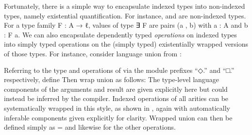 \documentclass[acmsmall,screen,timestamp,anonymous,review]{acmart}
\begin{document}
Fortunately, there is a simple way to encapsulate indexed types into non-indexed types, namely existential quantification.
For instance, { } and { } are non-indexed types.
For a type family {\AB F \AK : \AB A \AK →  \AB ℓ}, values of type {\AF ∃ \AB F} are pairs {(\AB a , \AB b)} with {\AB a \AK : \AB A} and {\AB b \AK : \AB F \AB a}.
We can also encapsulate dependently typed \emph{operations} on indexed types into simply typed operations on the (simply typed) existentially wrapped versions of those types.
For instance, consider language union from :
\begin{code}
\>[2]%
\>[7]\AgdaSymbol{:}\AgdaSpace{}%
%
\>[15]%
\>[18]\AgdaSpace{}%
\AgdaSpace{}%
%
\>[28]\AgdaSpace{}%
\AgdaSpace{}%
\AgdaSymbol{(}%
\>[39]%
\>[44]\AgdaSymbol{)}\<%
\end{code}
Referring to the type and operations of  via the module prefixes ``{◇.}\hspace{0.05em}'' and ``{□.}\hspace{0.05em}'' respectively, define 
Then wrap union as follows:
The type-level language components of the arguments and result are given explicitly here but could instead be inferred by the compiler.
\rnc{}
Indexed operations of all arities can be systematically wrapped in this style, as shown in
, again with automatically inferable components given explicitly for clarity.
Wrapped union can then be defined simply as { \AS =  } and likewise for the other operations.
\end{document}

